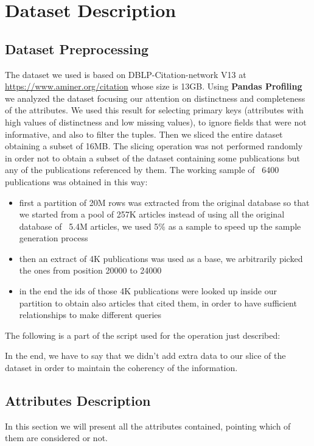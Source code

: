 \documentclass{Configuration_Files/PoliMi3i_thesis}
\begin{document}
\chapter{Dataset Description}

\section{Dataset Preprocessing}
The dataset we used is based on DBLP-Citation-network V13 at \url{https://www.aminer.org/citation} whose size is 13GB. Using
\textbf{Pandas Profiling} we analyzed the dataset focusing our attention on distinctness and completeness of the attributes.
We used this result for selecting primary keys (attributes with high values of distinctness and low missing values), to ignore
fields that were not informative, and also to filter the tuples. Then we sliced the entire dataset obtaining a subset of 16MB.
The slicing operation was not performed randomly in order not to obtain a subset of the dataset containing some publications but any
of the publications referenced by them. The working sample of ~6400 publications was obtained in this way:
\begin{itemize}
    \item first a partition of 20M rows was extracted from the original database so that we started from a pool of 257K articles
        instead of using all the original database of ~5.4M articles, we used 5\% as a sample to speed up the sample generation
        process
    \item then an extract of 4K publications was used as a base, we arbitrarily picked the ones from position 20000 to 24000
    \item in the end the ids of those 4K publications were looked up inside our partition to obtain also articles that cited
        them, in order to have sufficient relationships to make different queries
\end{itemize}
The following is a part of the script used for the operation just described:

\bigskip
In the end, we have to say that we didn't add extra data to our slice of the dataset in order to maintain the coherency of the
information.

\section{Attributes Description}
In this section we will present all the attributes contained, pointing which of them are considered or not.
\end{document}
